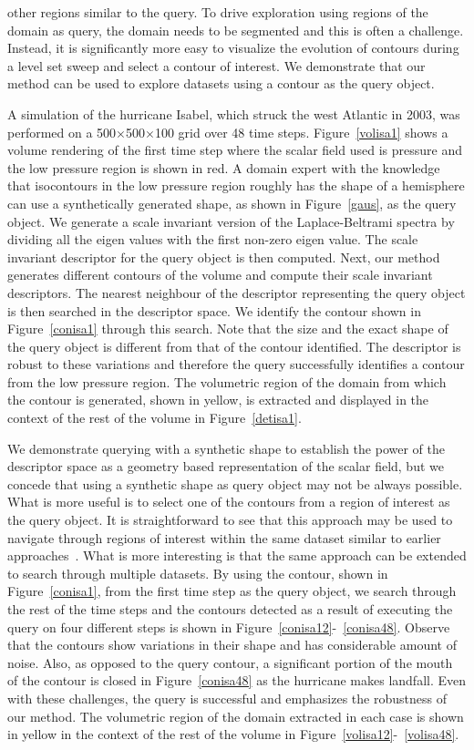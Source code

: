 \documentclass[review,journal]{vgtc}         %
\begin{document}
other regions similar to the query. To drive exploration using regions of the domain as query, the domain 
needs to be segmented and this is often a challenge. Instead, it is significantly more easy to visualize the
evolution of contours during a level set sweep and select a contour of interest. 
We demonstrate that our method can be used to explore datasets using a contour as the query object.

A simulation of the hurricane Isabel, which struck the west Atlantic in 2003, was performed
on a 500$\times$500$\times$100 grid over 48 time steps. Figure~\ref{volisa1} shows a volume rendering
of the first time step where the scalar field used is pressure and the low pressure region
is shown in red. A domain expert with the knowledge that isocontours in the low pressure region
roughly has the shape of a hemisphere can use a synthetically generated shape, as shown in 
Figure~\ref{gaus}, as the query object. We generate a scale invariant version of the Laplace-Beltrami
spectra by dividing all the eigen values with the first non-zero eigen value. The scale invariant
descriptor for the query object is then computed. Next, our method generates different contours of the 
volume and compute their scale invariant descriptors. The nearest neighbour of the descriptor 
representing the query object is then searched in the descriptor space. We identify the contour
shown in Figure~\ref{conisa1} through this search. Note that the size and the exact shape of the
query object is different from that of the contour identified.
The descriptor is robust to these variations and therefore the query successfully identifies 
a contour from the low pressure region. The volumetric region of the domain from which the contour
is generated, shown in yellow, is extracted and displayed in the context of the rest of the volume in 
Figure~\ref{detisa1}. 

We demonstrate querying with
a synthetic shape to establish the power of the descriptor space as a geometry based representation 
of the scalar field, but we concede that using a synthetic shape as query object may not be always 
possible. What is more useful is to select one of the contours from a region of interest as the query
object. It is straightforward to see that this approach may be used
to navigate through regions of interest within the same dataset similar to earlier approaches~\cite{ThomN13,MasoodTN13}.
What is more interesting is that the same approach can be extended to search through multiple datasets.
By using the contour, shown in Figure~\ref{conisa1}, from the first time step  as the query object, we search through 
the rest of the time steps and the contours detected as a result of executing the query on four different 
steps is shown in Figure~\ref{conisa12}-~\ref{conisa48}. Observe that
the contours show variations in their shape and has considerable amount of noise. 
Also, as opposed to the query contour, a significant portion
of the mouth of the contour is closed in Figure~\ref{conisa48} as the hurricane makes landfall.
Even with these challenges, the query is successful and emphasizes the robustness of our method.
The volumetric region of the domain extracted in each case is shown in yellow in the context of the rest
of the volume in Figure~\ref{volisa12}-~\ref{volisa48}.
\end{document}
